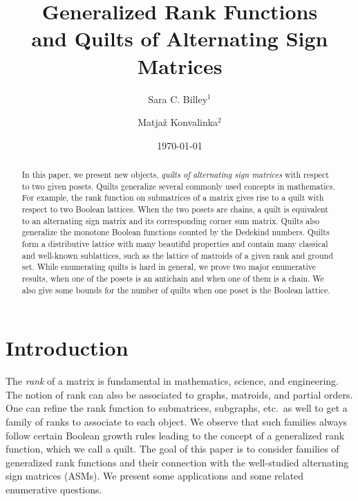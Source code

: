 \documentclass[12pt]{amsart}
\title[Generalized Rank Functions
and Quilts of Alternating Sign
Matrices]{Generalized Rank Functions \\
and Quilts of Alternating Sign Matrices}
\date{\today}
\author{Sara C. Billey$^{1}$}
\author{Matja\v z Konvalinka$^{2}$}
\numberwithin{equation}{section}
\theoremstyle{definition}
\begin{document}
\begin{abstract}
In this paper, we present new objects, \emph{quilts of alternating
sign matrices} with respect to two given posets.
Quilts generalize several commonly used concepts in mathematics.  For
example, the rank function on submatrices of a matrix gives rise to a
quilt with respect to two Boolean lattices.  
When the two posets are chains, a quilt is equivalent to an
alternating sign matrix and its corresponding corner sum matrix.  Quilts
also generalize the monotone Boolean functions counted by the Dedekind
numbers.  Quilts form a distributive lattice with many beautiful
properties and contain many classical and well-known sublattices, such
as the lattice of matroids of a given rank and ground set.  While
enumerating quilts is hard in general, we prove two major enumerative
results, when one of the posets is an antichain and when one of them
is a chain. We also give some bounds for the number of quilts when one
poset is the Boolean lattice.
\end{abstract}


\maketitle




\section{Introduction} \label{sec:intro}


The \textit{rank} of a matrix is fundamental in mathematics, science,
and engineering.  The notion of rank can also be associated to graphs,
matroids, and partial orders.  One can refine the rank function to
submatrices, subgraphs, etc.\ as well to get a family of ranks to
associate to each object.  We observe that such families always follow
certain Boolean growth rules leading to the concept of a generalized
rank function, which we call a quilt.  The goal of this paper is
to consider families of generalized rank functions and their
connection with the well-studied alternating sign matrices (ASMs). We
present some applications and some related enumerative questions.
\end{document}
